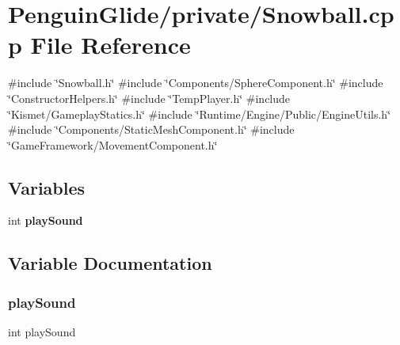 \section{Penguin\+Glide/private/\+Snowball.cpp File Reference}
\label{_snowball_8cpp}
{\ttfamily \#include \char`\"{}Snowball.\+h\char`\"{}}\newline
{\ttfamily \#include \char`\"{}Components/\+Sphere\+Component.\+h\char`\"{}}\newline
{\ttfamily \#include \char`\"{}Constructor\+Helpers.\+h\char`\"{}}\newline
{\ttfamily \#include \char`\"{}Temp\+Player.\+h\char`\"{}}\newline
{\ttfamily \#include \char`\"{}Kismet/\+Gameplay\+Statics.\+h\char`\"{}}\newline
{\ttfamily \#include \char`\"{}Runtime/\+Engine/\+Public/\+Engine\+Utils.\+h\char`\"{}}\newline
{\ttfamily \#include \char`\"{}Components/\+Static\+Mesh\+Component.\+h\char`\"{}}\newline
{\ttfamily \#include \char`\"{}Game\+Framework/\+Movement\+Component.\+h\char`\"{}}\newline
\subsection*{Variables}
\begin{DoxyCompactItemize}
\item 
int \textbf{ play\+Sound}
\end{DoxyCompactItemize}


\subsection{Variable Documentation}
\mbox{\label{_snowball_8cpp_aeff68b002b03dc51eadd64eb8fc29adb}} 
\subsubsection{playSound}
{\footnotesize\ttfamily int play\+Sound}

